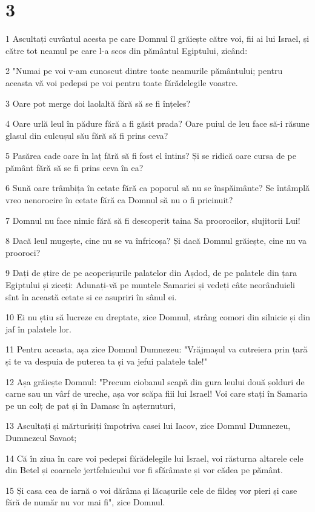\chapter{3}

\par 1 Ascultați cuvântul acesta pe care Domnul îl grăiește către voi, fii ai lui Israel, și către tot neamul pe care l-a scos din pământul Egiptului, zicând:
\par 2 "Numai pe voi v-am cunoscut dintre toate neamurile pământului; pentru aceasta vă voi pedepsi pe voi pentru toate fărădelegile voastre.
\par 3 Oare pot merge doi laolaltă fără să se fi înțeles?
\par 4 Oare urlă leul în pădure fără a fi găsit prada? Oare puiul de leu face să-i răsune glasul din culcușul său fără să fi prins ceva?
\par 5 Pasărea cade oare în laț fără să fi fost el întins? Și se ridică oare cursa de pe pământ fără să se fi prins ceva în ea?
\par 6 Sună oare trâmbița în cetate fără ca poporul să nu se înspăimânte? Se întâmplă vreo nenorocire în cetate fără ca Domnul să nu o fi pricinuit?
\par 7 Domnul nu face nimic fără să fi descoperit taina Sa proorocilor, slujitorii Lui!
\par 8 Dacă leul mugește, cine nu se va înfricoșa? Și dacă Domnul grăiește, cine nu va prooroci?
\par 9 Dați de știre de pe acoperișurile palatelor din Așdod, de pe palatele din țara Egiptului și ziceți: Adunați-vă pe muntele Samariei și vedeți câte neorânduieli sînt în această cetate si ce asupriri în sânul ei.
\par 10 Ei nu știu să lucreze cu dreptate, zice Domnul, strâng comori din silnicie și din jaf în palatele lor.
\par 11 Pentru aceasta, așa zice Domnul Dumnezeu: "Vrăjmașul va cutreiera prin țară și te va despuia de puterea ta și va jefui palatele tale!"
\par 12 Așa grăiește Domnul: "Precum ciobanul scapă din gura leului două șolduri de carne sau un vârf de ureche, așa vor scăpa fiii lui Israel! Voi care stați în Samaria pe un colț de pat și în Damasc în așternuturi,
\par 13 Ascultați și mărturisiți împotriva casei lui Iacov, zice Domnul Dumnezeu, Dumnezeul Savaot;
\par 14 Că în ziua în care voi pedepsi fărădelegile lui Israel, voi răsturna altarele cele din Betel și coarnele jertfelnicului vor fi sfărâmate și vor cădea pe pământ.
\par 15 Și casa cea de iarnă o voi dărâma și lăcașurile cele de fildeș vor pieri și case fără de număr nu vor mai fi", zice Domnul.

